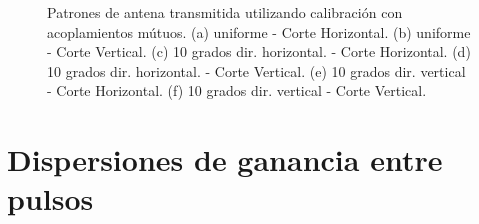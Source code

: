 \begin{figure}[H]
		\caption{Patrones de antena transmitida utilizando calibración con acoplamientos mútuos. (a) uniforme - Corte Horizontal.
			(b) uniforme - Corte Vertical. (c) 10 grados dir. horizontal. - Corte Horizontal. (d) 10 grados dir. horizontal. - Corte 
			Vertical. (e) 10 grados dir. vertical - Corte Horizontal. (f) 10 grados dir. vertical - Corte Vertical.}
	\label{fig:compErrorMutualPat}
\end{figure}


\section{Dispersiones de ganancia entre pulsos}

